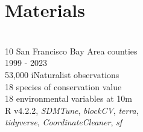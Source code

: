\documentclass[a0paper,fleqn]{betterposter}
\begin{document}
{\section{Materials}
\def\iconspace{2mm}
\vspace{-15mm}
\\\faMapO   \hspace{1cm} 10 San Francisco Bay Area counties
\vspace{\iconspace}
\\\faClockO \hspace{1cm} 1999 - 2023
\vspace{\iconspace}
\\\faMapMarker \hspace{1.3cm} 53,000 iNaturalist observations
\vspace{\iconspace}
\\\faLeaf \hspace{1.3cm} 18 species of conservation value
\vspace{\iconspace}
\\\faSunO \hspace{.9cm} 18 environmental variables at 10m
\vspace{\iconspace}
\\\faCode \hspace{1cm} R v4.2.2, \textit{SDMTune}, \textit{blockCV}, \textit{terra}, 
\\ \hspace*{2.1cm} \textit{tidyverse}, \textit{CoordinateCleaner}, \textit{sf}


}
\end{document}
